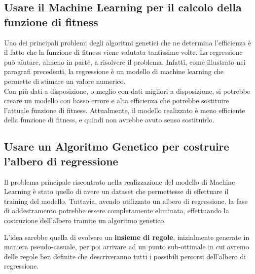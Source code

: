 \documentclass[a4paper, 11pt, oneside]{report}
\begin{document}
                \subsection{Usare il Machine Learning per il calcolo della funzione di fitness}
                Uno dei principali problemi degli algoritmi genetici che ne determina l'efficienza è il fatto che la funzione di fitness
                viene valutata tantissime volte.
                La regressione può aiutare, almeno in parte, a risolvere il problema.
                Infatti, come illustrato nei paragrafi precedenti, la regressione è un modello di machine learning che permette di stimare
                un valore numerico.\\
                Con più dati a disposizione, o meglio con dati migliori a disposizione, si potrebbe creare un modello con basso errore e alta efficienza
                che potrebbe sostituire l'attuale funzione di fitness.
                Attualmente, il modello realizzato è meno efficiente della funzione di fitness, e quindi non avrebbe avuto senso sostituirlo.


                \subsection{Usare un Algoritmo Genetico per costruire l'albero di regressione}
                Il problema principale riscontrato nella realizzazione del modello di Machine Learning è stato quello di avere
                un dataset che permettesse di effettuare il training del modello.
                Tuttavia, avendo utilizzato un albero di regressione, la fase di addestramento potrebbe essere completamente eliminata,
                effettuando la costruzione dell'albero tramite un algoritmo genetico.
                \par \noindent L'idea sarebbe quella di evolvere un \textbf{insieme di regole}, inizialmente
                generate in maniera pseudo-casuale, per poi arrivare ad un punto sub-ottimale in cui avremo delle regole
                ben definite che descriveranno tutti i possibili percorsi dell'albero di regressione.
\end{document}
